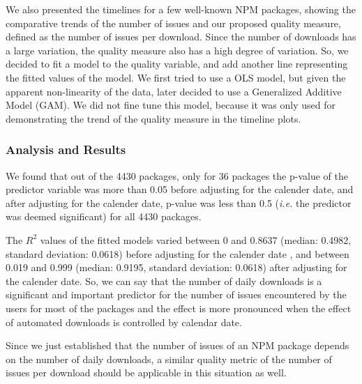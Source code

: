 \documentclass[smallcondensed]{svjour3}     %
\begin{document}
We also presented the timelines for a few well-known NPM packages, showing the comparative trends of the number of issues and our proposed quality measure, defined as the number of issues per download. Since the number of downloads has a large variation, the quality measure also has a high degree of variation. So, we decided to fit a model to the quality variable, and add another line representing the fitted values of the model. We first tried to use a OLS model, but given the apparent non-linearity of the data, later decided to use a Generalized Additive Model (GAM). We did not fine tune this model, because it was only used for demonstrating the trend of the quality measure in the timeline plots.

\subsubsection{Analysis and Results}

We found that out of the 4430 packages, only for 36 packages the p-value of the predictor variable was more than 0.05 before adjusting for the calender date, and after adjusting for the calender date, p-value was less than 0.5 (\emph{i.e.} the predictor was deemed significant) for all 4430 packages. 

The $R^2$ values of the fitted models varied between 0 and 0.8637 (median: 0.4982, standard deviation: 0.0618) before adjusting for the calender date , and between 0.019 and 0.999 (median: 0.9195, standard deviation: 0.0618) after  adjusting for the calender date. So, we can say that the number of daily downloads is a significant and important predictor for the number of issues encountered by the users for most of the packages and the effect is more pronounced when the effect of automated downloads is controlled by calendar date. 

Since we just established that the number of issues of an NPM package depends on the number of daily downloads, a similar quality metric of the number of issues per download should be applicable in this situation as well. 
\end{document}
